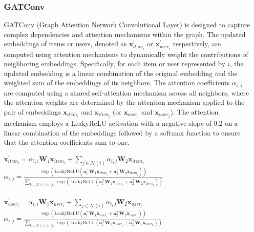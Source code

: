 \documentclass[bst/sn-nature]{sn-jnl}
\begin{document}
\begin{multicols}{2}
\subsubsection{GATConv\cite{gatconv}} 

\quad GATConv (Graph Attention Network Convolutional Layer) is designed to capture complex dependencies and attention mechanisms within the graph. The updated embeddings of items or users, denoted as $\mathbf{x}^{\prime}_{item_i}$ or $\mathbf{x}^{\prime}_{user_i}$ respectively, are computed using attention mechanisms to dynamically weight the contributions of neighboring embeddings. Specifically, for each item or user represented by $i$, the updated embedding is a linear combination of the original embedding and the weighted sum of the embeddings of its neighbors. The attention coefficients $\alpha_{i,j}$ are computed using a shared self-attention mechanism across all neighbors, where the attention weights are determined by the attention mechanism applied to the pair of embeddings $\mathbf{x}_{item_i}$ and $\mathbf{x}_{item_j}$ (or $\mathbf{x}_{user_i}$ and $\mathbf{x}_{user_j}$). The attention mechanism employs a LeakyReLU activation with a negative slope of 0.2 on a linear combination of the embeddings followed by a softmax function to ensure that the attention coefficients sum to one.\\ 

\begin{center}
    $\mathbf{x}^{\prime}_{item_{i}} = \alpha_{i,i}\mathbf{W}_{1}\mathbf{x}_{item_{i}} + \sum_{j \in \mathcal{N}(i)} \alpha_{i,j}\mathbf{W}_{2}\mathbf{x}_{item_{j}}$\\
    $\alpha_{i,j} =
    \frac{
    \exp\left(\mathrm{LeakyReLU}\left(
    \mathbf{a}^{\top}_{1} \mathbf{W}_{1}\mathbf{x}_{item_{i}}
    + \mathbf{a}^{\top}_{2} \mathbf{W}_{2}\mathbf{x}_{item_{j}}
    \right)\right)}
    {\sum_{k \in \mathcal{N}(i) \cup \{ i \}}
    \exp\left(\mathrm{LeakyReLU}\left(
    \mathbf{a}^{\top}_{1} \mathbf{W}_{1}\mathbf{x}_{item_{i}}
    + \mathbf{a}^{\top}_{2}\mathbf{W}_{2}\mathbf{x}_{item_{k}}
    \right)\right)}$ \\~\\
    $\mathbf{x}^{\prime}_{user_{i}} = \alpha_{i,i}\mathbf{W}_{1}\mathbf{x}_{user_{i}} + \sum_{j \in \mathcal{N}(i)} \alpha_{i,j}\mathbf{W}_{2}\mathbf{x}_{user_{j}}$\\
    $\alpha_{i,j} =
    \frac{
    \exp\left(\mathrm{LeakyReLU}\left(
    \mathbf{a}^{\top}_{1} \mathbf{W}_{1}\mathbf{x}_{user_{i}}
    + \mathbf{a}^{\top}_{2} \mathbf{W}_{2}\mathbf{x}_{user_{j}}
    \right)\right)}
    {\sum_{k \in \mathcal{N}(i) \cup \{ i \}}
    \exp\left(\mathrm{LeakyReLU}\left(
    \mathbf{a}^{\top}_{1} \mathbf{W}_{1}\mathbf{x}_{user_{i}}
    + \mathbf{a}^{\top}_{2}\mathbf{W}_{2}\mathbf{x}_{user_{k}}
    \right)\right)}$
\end{center}


\end{multicols}
\end{document}
